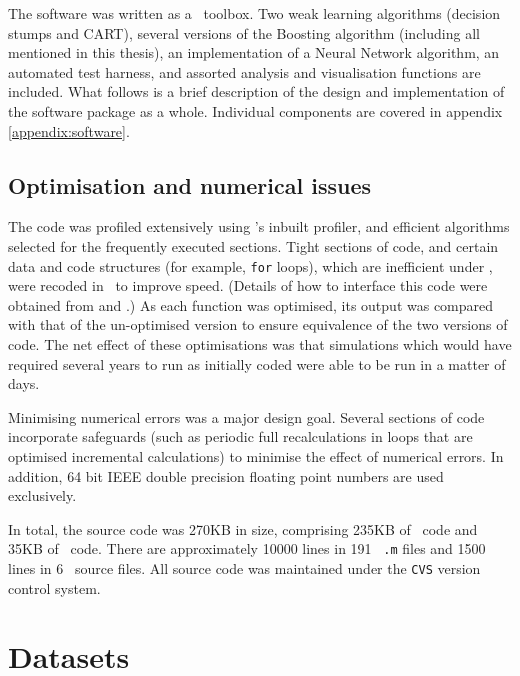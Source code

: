 The software was written as a \MATLAB\ toolbox.  Two weak learning
algorithms (decision stumps and CART), several versions of the
Boosting algorithm (including all mentioned in this thesis), an
implementation of a Neural Network algorithm, an automated test
harness, and assorted analysis and visualisation functions are
included.  What follows is a brief description of the design and
implementation of the software package as a whole.  Individual
components are covered in appendix \ref{appendix:software}.

\subsection{Optimisation and numerical issues}

The code was profiled extensively using \MATLAB's inbuilt profiler,
and efficient algorithms selected for the frequently executed
sections.  Tight sections of code, and certain data and code
structures (for example, {\tt for} loops), which are inefficient under
\MATLAB, were recoded in \C\ to improve speed.  (Details of how
to interface this code were obtained from \cite{MathWorks96} and
\cite{MathWorks96a}.) As each function was optimised, its output was
compared with that of the un-optimised version to ensure equivalence
of the two versions of code.  The net effect of these optimisations
was that simulations which would have required several years to run as
initially coded were able to be run in a matter of days.

Minimising numerical errors was a major design goal.  Several sections
of code incorporate safeguards (such as periodic full recalculations
in loops that are optimised incremental calculations) to minimise the
effect of numerical errors.  In addition, 64 bit IEEE double precision
floating point numbers are used exclusively.

In total, the source code was 270KB in size, comprising 235KB of
\MATLAB\ code and 35KB of \C\ code.  There are approximately 10000
lines in 191 \MATLAB\ {\tt .m} files and 1500 lines in 6 \C\ source
files.  All source code was maintained under the {\tt CVS} version
control system.

\section{Datasets}

